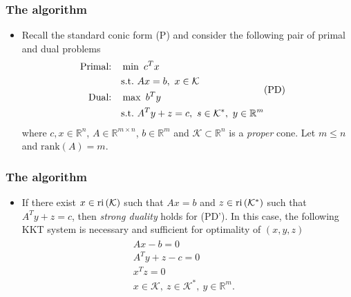 \documentclass{beamer}
\def\interior{\protect{\textnormal{ri}}}
\begin{document}
\begin{frame}
	\frametitle{The algorithm}
	\begin{itemize}
		\item Recall the standard conic form (P) and consider the following pair of primal and dual problems
		\begin{align}
		\begin{split} 
		\text{Primal:} \quad &\min\,\, c^Tx\\ 
		&\textnormal{s.t.} \,\, Ax=b,\ x\in \mathcal{K} \\
		\text{Dual:}  \quad &\max\,\, b^Ty \\
		&\textnormal{s.t.} \,\, A^Ty+z=c,\ s\in\mathcal{K}^*,\ y \in \mathbb{R}^m \\
		\end{split} &\text{(PD)} \nonumber	
		\end{align}
		where $c,x \in \mathbb{R}^n$, $A\in \mathbb{R}^{m\times n}$, $b\in \mathbb{R}^m$ and $\mathcal{K} \subset \mathbb{R}^n$ is a \textit{proper} cone. Let $m\leq n$ and $\text{rank}(A) = m$. 
	\end{itemize}
\end{frame}

\begin{frame}
	\frametitle{The algorithm}
	\begin{itemize}
		\item If there exist
		$x \in \interior \left(\mathcal{K}\right)$ such that $Ax=b$ and $z \in \interior \left(\mathcal{K}^*\right)$ such that $A^Ty+z=c$,
		then \textit{strong duality} holds for (PD'). In this case, the following KKT system is necessary and sufficient for optimality of $(x,y,z)$
		\begin{align}\label{KKT_for_PD}
		\begin{split}
		Ax-b=0& \\
		A^Ty+z-c=0& \\
		x^Tz=0& \\
		x\in\mathcal{K},\ z\in \mathcal{K}^*,\ y\in\mathbb{R}^m.& 
		\end{split}
		\end{align}
	\end{itemize}
\end{frame}
\end{document}
